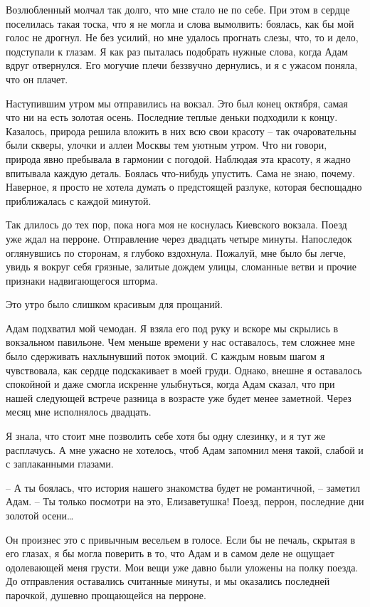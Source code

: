 \documentclass[
]{book}
\begin{document}
Возлюбленный молчал так долго, что мне стало не по себе. При этом в сердце поселилась такая тоска, что я не могла и слова вымолвить: боялась, как бы мой голос не дрогнул. Не без усилий, но мне удалось прогнать слезы, что, то и дело, подступали к глазам. Я как раз пыталась подобрать нужные слова, когда Адам вдруг отвернулся. Его могучие плечи беззвучно дернулись, и я с ужасом поняла, что он плачет.

Наступившим утром мы отправились на вокзал. Это был конец октября, самая что ни на есть золотая осень. Последние теплые деньки подходили к концу. Казалось, природа решила вложить в них всю свои красоту -- так очаровательны были скверы, улочки и аллеи Москвы тем уютным утром. Что ни говори, природа явно пребывала в гармонии с погодой. Наблюдая эта красоту, я жадно впитывала каждую деталь. Боялась что-нибудь упустить. Сама не знаю, почему. Наверное, я просто не хотела думать о предстоящей разлуке, которая беспощадно приближалась с каждой минутой.

Так длилось до тех пор, пока нога моя не коснулась Киевского вокзала. Поезд уже ждал на перроне. Отправление через двадцать четыре минуты. Напоследок оглянувшись по сторонам, я глубоко вздохнула. Пожалуй, мне было бы легче, увидь я вокруг себя грязные, залитые дождем улицы, сломанные ветви и прочие признаки надвигающегося шторма.

Это утро было слишком красивым для прощаний.

Адам подхватил мой чемодан. Я взяла его под руку и вскоре мы скрылись в вокзальном павильоне. Чем меньше времени у нас оставалось, тем сложнее мне было сдерживать нахлынувший поток эмоций. С каждым новым шагом я чувствовала, как сердце подскакивает в моей груди. Однако, внешне я оставалось спокойной и даже смогла искренне улыбнуться, когда Адам сказал, что при нашей следующей встрече разница в возрасте уже будет менее заметной. Через месяц мне исполнялось двадцать.

Я знала, что стоит мне позволить себе хотя бы одну слезинку, и я тут же расплачусь. А мне ужасно не хотелось, чтоб Адам запомнил меня такой, слабой и с заплаканными глазами.

-- А ты боялась, что история нашего знакомства будет не романтичной, -- заметил Адам. -- Ты только посмотри на это, Елизаветушка! Поезд, перрон, последние дни золотой осени\ldots{}

Он произнес это с привычным весельем в голосе. Если бы не печаль, скрытая в его глазах, я бы могла поверить в то, что Адам и в самом деле не ощущает одолевающей меня грусти. Мои вещи уже давно были уложены на полку поезда. До отправления оставались считанные минуты, и мы оказались последней парочкой, душевно прощающейся на перроне.
\end{document}
